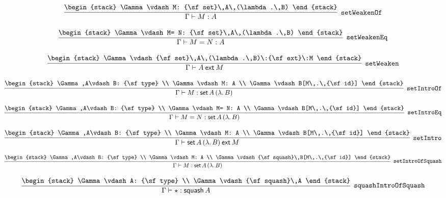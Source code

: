\[
\infer[{\tt setWeakenOf}]{\Gamma \vdash M: A}{
\begin{stack}
\Gamma \vdash M: {\sf set}\,A\,(\lambda .\,B)
\end{stack}}
\]

\[
\infer[{\tt setWeakenEq}]{\Gamma \vdash M= N: A}{
\begin{stack}
\Gamma \vdash M= N: {\sf set}\,A\,(\lambda .\,B)
\end{stack}}
\]

\[
\infer[{\tt setWeaken}]{\Gamma \vdash A\:{\sf ext}\:M}{
\begin{stack}
\Gamma \vdash {\sf set}\,A\,(\lambda .\,B)\:{\sf ext}\:M
\end{stack}}
\]

\[
\infer[{\tt setIntroOf}]{\Gamma \vdash M: {\sf set}\,A\,(\lambda .\,B)}{
\begin{stack}
\Gamma ,A\vdash B: {\sf type}
\\
\Gamma \vdash M: A
\\
\Gamma \vdash B[M\,.\,{\sf id}]
\end{stack}}
\]

\[
\infer[{\tt setIntroEq}]{\Gamma \vdash M= N: {\sf set}\,A\,(\lambda .\,B)}{
\begin{stack}
\Gamma ,A\vdash B: {\sf type}
\\
\Gamma \vdash M= N: A
\\
\Gamma \vdash B[M\,.\,{\sf id}]
\end{stack}}
\]

\[
\infer[{\tt setIntro}]{\Gamma \vdash {\sf set}\,A\,(\lambda .\,B)\:{\sf ext}\:M}{
\begin{stack}
\Gamma ,A\vdash B: {\sf type}
\\
\Gamma \vdash M: A
\\
\Gamma \vdash B[M\,.\,{\sf id}]
\end{stack}}
\]

\[
\infer[{\tt setIntroOfSquash}]{\Gamma \vdash M: {\sf set}\,A\,(\lambda .\,B)}{
\begin{stack}
\Gamma ,A\vdash B: {\sf type}
\\
\Gamma \vdash M: A
\\
\Gamma \vdash {\sf squash}\,B[M\,.\,{\sf id}]
\end{stack}}
\]

\[
\infer[{\tt squashIntroOfSquash}]{\Gamma \vdash \star : {\sf squash}\,A}{
\begin{stack}
\Gamma \vdash A: {\sf type}
\\
\Gamma \vdash {\sf squash}\,A
\end{stack}}
\]

